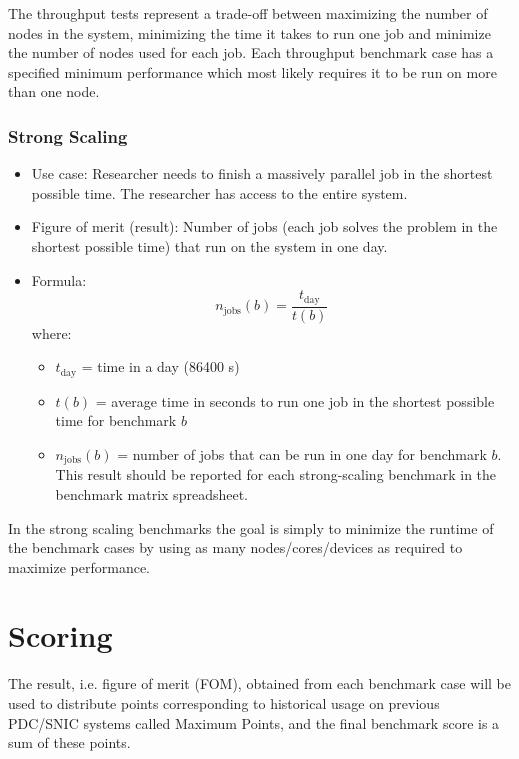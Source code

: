 \documentclass{article}
\begin{document}
The throughput tests represent a trade-off between maximizing the number of nodes in the system, minimizing the time it takes to run one job and minimize the number of nodes used for each job. Each
throughput benchmark case has a specified minimum performance which most likely requires it to be run on more than one node.

\subsubsection*{Strong Scaling}

\begin{itemize}
    \item Use case: Researcher needs to finish a massively parallel job in the shortest possible time. The researcher has access to the entire system.
    \item Figure of merit (result): Number of jobs (each job solves the problem in the shortest possible time) that run on the system in one day.
    \item Formula:
    \begin{equation}
        n_{\textrm{jobs}}(b) = \frac{t_{\textrm{day}}}{t(b)} 
    \end{equation}
    where:
    \begin{itemize}
        \item $t_{\textrm{day}}$ = time in a day (86400 s)
        \item $t(b)$ = average time in seconds to run one job in the shortest possible time for benchmark $b$
        \item $n_{\textrm{jobs}}(b)$ = number of jobs that can be run in one day for benchmark $b$. This result should be reported for each strong-scaling benchmark in the benchmark matrix spreadsheet.
    \end{itemize}
\end{itemize}

In the strong scaling benchmarks the goal is simply to minimize the runtime of the benchmark cases by using as many nodes/cores/devices as required to maximize performance.


\section*{Scoring}

The result, i.e. figure of merit (FOM), obtained from each benchmark case will be used to distribute points corresponding to historical usage on previous PDC/SNIC systems called Maximum Points, and the final benchmark score is a sum of these points.
\end{document}
